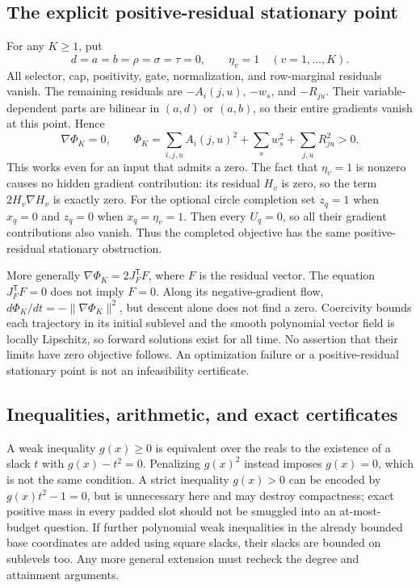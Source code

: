 \subsection{The explicit positive-residual stationary point}
\label{sec:budget-stationary}
For any $K\ge1$, put
\[
 d=a=b=\rho=\sigma=\tau=0,\qquad \eta_v=1\quad(v=1,\ldots,K).
\]
All selector, cap, positivity, gate, normalization, and row-marginal
residuals vanish. The remaining residuals are $-A_i(j,u)$, $-w_s$, and
$-R_{ju}$. Their variable-dependent parts are bilinear in $(a,d)$ or
$(a,b)$, so their entire gradients vanish at this point. Hence
\[
 \nabla\Phi_K=0,\qquad
 \Phi_K=\sum_{i,j,u}A_i(j,u)^2+\sum_sw_s^2+\sum_{j,u}R_{ju}^2>0.
\]
This works even for an input that admits a zero. The fact that $\eta_v=1$
is nonzero causes no hidden gradient contribution: its residual $H_v$ is
zero, so the term $2H_v\nabla H_v$ is exactly zero.
For the optional circle completion set $z_q=1$ when $x_q=0$ and $z_q=0$
when $x_q=\eta_v=1$. Then every $U_q=0$, so all their gradient contributions
also vanish. Thus the completed objective has the same positive-residual
stationary obstruction.

More generally $\nabla\Phi_K=2J_F^{\mathsf T}F$, where $F$ is the residual
vector. The equation $J_F^{\mathsf T}F=0$ does not imply $F=0$. Along its
negative-gradient flow,
$d\Phi_K/dt=-\|\nabla\Phi_K\|^2$, but descent alone does not find a zero.
Coercivity bounds each trajectory in its initial sublevel and the smooth
polynomial vector field is locally Lipschitz, so forward solutions exist
for all time. No assertion that their limits have zero objective follows.
An optimization failure or a positive-residual stationary point is not an
infeasibility certificate.

\subsection{Inequalities, arithmetic, and exact certificates}
A weak inequality $g(x)\ge0$ is equivalent over the reals to the existence
of a slack $t$ with $g(x)-t^2=0$. Penalizing $g(x)^2$ instead imposes
$g(x)=0$, which is not the same condition. A strict inequality $g(x)>0$
can be encoded by $g(x)t^2-1=0$, but is unnecessary here and may destroy
compactness; exact positive mass in every padded slot should not be
smuggled into an at-most-budget question. If further polynomial weak
inequalities in the already bounded base coordinates are added using
square slacks, their slacks are bounded on sublevels too. Any more general
extension must recheck the degree and attainment arguments.

